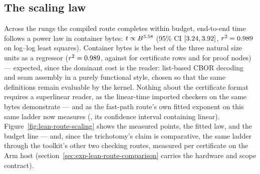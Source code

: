 \begin{table}[htbp]
\centering\footnotesize

\caption{The ladder. ``compiled'' is the median end-to-end wall clock
of repeated passes of the compiled route; ``kernel'' is the wall clock
of one kernel (\texttt{decide}) evaluation of the same bytes. Em-dashes
are runs cut at the \LeanRouteBudgetMin-minute budget; \emph{n.a.}\
marks kernel runs not attempted because every in-fragment kernel
attempt at smaller sizes had already ended cut or out of memory.}
\label{tab:lean-route-ladder}
\end{table}

\subsection{The scaling law}

Across the \LeanRoutePointCount{} rungs the compiled route completes
within budget, end-to-end time follows a power law in container bytes:
$t \propto B^{3.58}$ (95\% CI $[3.24,
3.92]$, $r^2 = 0.989$ on log--log least
squares). Container bytes is the best of the three natural size units as a
regressor ($r^2 = 0.989$, against \LeanRouteRSqRows{} for
certificate rows and \LeanRouteRSqNodes{} for proof nodes) --- expected,
since the dominant cost is the reader: list-based CBOR decoding and
seam assembly in a purely functional style, chosen so that the same
definitions remain evaluable by the kernel. Nothing about the
certificate format requires a superlinear reader, as the linear-time
imported checkers on the same bytes demonstrate --- and as the
fast-path route's own fitted exponent on this same ladder now
measures (\GlcRouteExponent, its confidence interval containing
linear). Figure~\ref{fig:lean-route-scaling}
shows the measured points, the fitted law, and the budget line ---
and, since the trichotomy's claim is comparative, the same ladder
through the toolkit's other two checking routes, measured per
certificate on the Arm host
(section~\ref{sec:exp-lean-route-comparison} carries the
hardware and scope contract).

